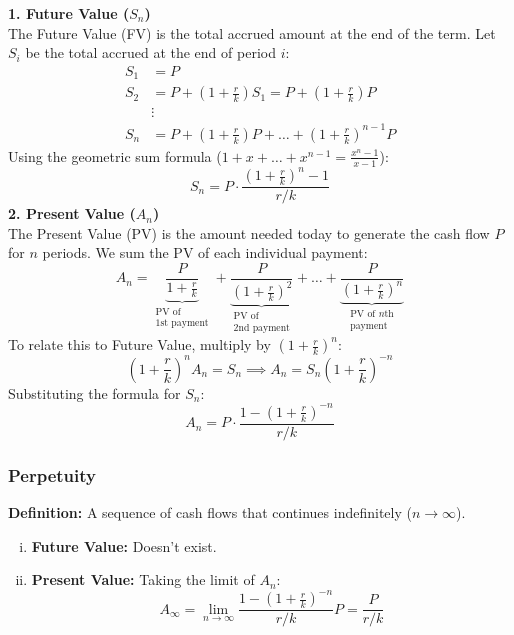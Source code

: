 \noindent \textbf{1. Future Value ($S_n$)} \\
The Future Value (FV) is the total accrued amount at the end of the term. Let $S_i$ be the total accrued at the end of period $i$:
\begin{align*}
    S_1 &= P \\
    S_2 &= P + \left(1+\frac{r}{k}\right)S_1 = P + \left(1+\frac{r}{k}\right)P \\
    &\vdots \\
    S_n &= P + \left(1+\frac{r}{k}\right)P + \dots + \left(1+\frac{r}{k}\right)^{n-1}P
\end{align*}
Using the geometric sum formula ($1+x+\dots+x^{n-1} = \frac{x^n-1}{x-1}$):
\begin{equation*}
    \boxed{S_n = P \cdot \frac{(1+\frac{r}{k})^n - 1}{r/k}}
\end{equation*}
\noindent \textbf{2. Present Value ($A_n$)} \\
The Present Value (PV) is the amount needed today to generate the cash flow $P$ for $n$ periods. We sum the PV of each individual payment:
\[
A_n = \underbrace{\frac{P}{1+\frac{r}{k}}}_{\substack{\text{PV of} \\ \text{1st payment}}}
+ \underbrace{\frac{P}{(1+\frac{r}{k})^2}}_{\substack{\text{PV of} \\ \text{2nd payment}}}
+ \dots
+ \underbrace{\frac{P}{(1+\frac{r}{k})^n}}_{\substack{\text{PV of } n\text{th} \\ \text{payment}}}
\]
To relate this to Future Value, multiply by $(1+\frac{r}{k})^n$:
\[
\left(1+\frac{r}{k}\right)^n A_n = S_n \implies A_n = S_n \left(1+\frac{r}{k}\right)^{-n}
\]
Substituting the formula for $S_n$:
\begin{equation*}
    \boxed{A_n = P \cdot \frac{1 - (1+\frac{r}{k})^{-n}}{r/k}}
\end{equation*}

\subsubsection{Perpetuity}
\textbf{Definition:} A sequence of cash flows that continues indefinitely ($n \to \infty$).
\begin{enumerate}[i.]
    \item \textbf{Future Value:} Doesn't exist.
    \item \textbf{Present Value:} Taking the limit of $A_n$:
    \[
    A_{\infty} = \lim_{n \to \infty} \frac{1-(1+\frac{r}{k})^{-n}}{r/k}P = \boxed{\frac{P}{r/k}}
    \]
\end{enumerate}

